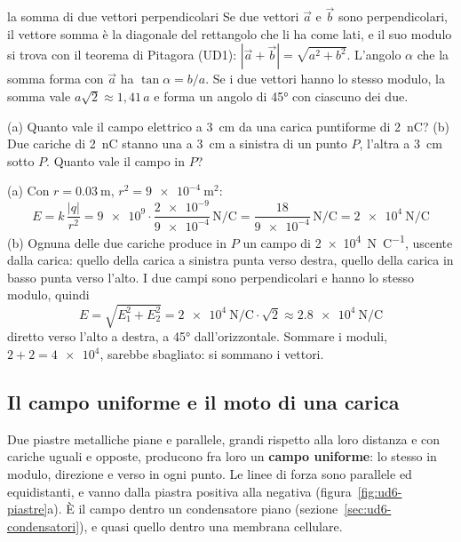 \begin{richiamo}{la somma di due vettori perpendicolari}
Se due vettori $\vec a$ e $\vec b$ sono perpendicolari, il vettore somma è la diagonale del rettangolo che li ha come lati, e il suo modulo si trova con il teorema di Pitagora (UD1): $|\vec a + \vec b| = \sqrt{a^{2} + b^{2}}$. L'angolo $\alpha$ che la somma forma con $\vec a$ ha $\tan\alpha = b/a$. Se i due vettori hanno lo stesso modulo, la somma vale $a\sqrt2 \approx 1{,}41\,a$ e forma un angolo di \ang{45} con ciascuno dei due.
\end{richiamo}

\begin{esempio}
(a) Quanto vale il campo elettrico a \SI{3}{\centi\metre} da una carica puntiforme di \SI{+2}{\nano\coulomb}? (b) Due cariche di \SI{+2}{\nano\coulomb} stanno una a \SI{3}{\centi\metre} a sinistra di un punto $P$, l'altra a \SI{3}{\centi\metre} sotto $P$. Quanto vale il campo in $P$?

(a) Con $r = \SI{0,03}{\metre}$, $r^{2} = \SI{9e-4}{\metre\squared}$:
\[
  E = k\,\frac{|q|}{r^{2}} = \num{9e9} \cdot \frac{\num{2e-9}}{\num{9e-4}}\,\si{\newton\per\coulomb} = \frac{18}{\num{9e-4}}\,\si{\newton\per\coulomb} = \SI{2e4}{\newton\per\coulomb}
\]
(b) Ognuna delle due cariche produce in $P$ un campo di \SI{2e4}{\newton\per\coulomb}, uscente dalla carica: quello della carica a sinistra punta verso destra, quello della carica in basso punta verso l'alto. I due campi sono perpendicolari e hanno lo stesso modulo, quindi
\[
  E = \sqrt{E_1^{2} + E_2^{2}} = \SI{2e4}{\newton\per\coulomb} \cdot \sqrt2 \approx \SI{2,8e4}{\newton\per\coulomb}
\]
diretto verso l'alto a destra, a \ang{45} dall'orizzontale. Sommare i moduli, $2 + 2 = \num{4e4}$, sarebbe sbagliato: si sommano i vettori.
\end{esempio}



\subsection{Il campo uniforme e il moto di una carica}

Due piastre metalliche piane e parallele, grandi rispetto alla loro distanza e con cariche uguali e opposte, producono fra loro un \textbf{campo uniforme}: lo stesso in modulo, direzione e verso in ogni punto. Le linee di forza sono parallele ed equidistanti, e vanno dalla piastra positiva alla negativa (figura~\ref{fig:ud6-piastre}a). È il campo dentro un condensatore piano (sezione~\ref{sec:ud6-condensatori}), e quasi quello dentro una membrana cellulare.

